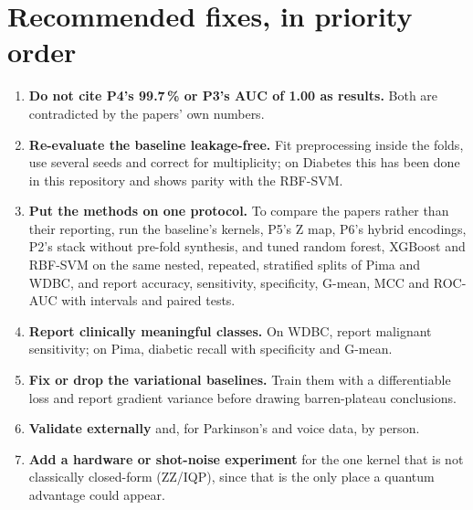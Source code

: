 \documentclass[11pt,a4paper]{article}
\begin{document}
\section{Recommended fixes, in priority order}
\label{sec:fixes}
\begin{enumerate}
  \item \textbf{Do not cite P4's 99.7\,\% or P3's AUC of 1.00 as results.} Both are contradicted by the papers' own numbers.
  \item \textbf{Re-evaluate the baseline leakage-free.} Fit preprocessing inside the folds, use several seeds and correct for multiplicity; on Diabetes this has been done in this repository and shows parity with the RBF-SVM.
  \item \textbf{Put the methods on one protocol.} To compare the papers rather than their reporting, run the baseline's kernels, P5's Z map, P6's hybrid encodings, P2's stack without pre-fold synthesis, and tuned random forest, XGBoost and RBF-SVM on the same nested, repeated, stratified splits of Pima and WDBC, and report accuracy, sensitivity, specificity, G-mean, MCC and ROC-AUC with intervals and paired tests.
  \item \textbf{Report clinically meaningful classes.} On WDBC, report malignant sensitivity; on Pima, diabetic recall with specificity and G-mean.
  \item \textbf{Fix or drop the variational baselines.} Train them with a differentiable loss and report gradient variance before drawing barren-plateau conclusions.
  \item \textbf{Validate externally} and, for Parkinson's and voice data, by person.
  \item \textbf{Add a hardware or shot-noise experiment} for the one kernel that is not classically closed-form (ZZ/IQP), since that is the only place a quantum advantage could appear.
\end{enumerate}

\end{document}
